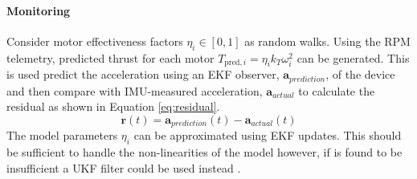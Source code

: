 \paragraph{Monitoring}
Consider motor effectiveness factors $\eta_i \in [0,1]$ as random walks. Using the \gls{RPM} telemetry, predicted thrust for each motor $T_{\text{pred},i} = \eta_i k_T \omega_i^2$ can be generated. This is used predict the acceleration using an \gls{EKF} observer, $\mathbf{a}_{prediction}$, of the device and then compare with IMU-measured acceleration,  $\mathbf{a}_{actual}$ to calculate the residual as shown in Equation \ref{eq:residual}. 
\begin{equation}\label{eq:residual}
    \mathbf{r}(t) = \mathbf{a}_{prediction}(t) - \mathbf{a}_{actual}(t)
\end{equation}
The model parameters $\eta_i$ can be approximated using \gls{EKF} updates. This should be sufficient to handle the non-linearities of the model however, if is found to be insufficient a \gls{UKF} filter could be used instead \cite{WAN2000}.
